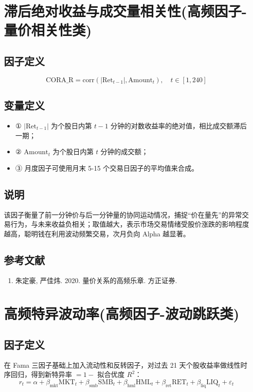 \documentclass{article}
\begin{document}
\section{滞后绝对收益与成交量相关性(高频因子-量价相关性类)}

\subsection{因子定义}
\begin{equation}
    \mathrm{CORA\_R} = \mathrm{corr}(|\mathrm{Ret}_{t-1}|, \mathrm{Amount}_t), \quad t \in [1, 240]
\end{equation}

\subsection{变量定义}
\begin{itemize}
    \item ① \( |\mathrm{Ret}_{t-1}| \) 为个股日内第 \( t-1 \) 分钟的对数收益率的绝对值，相比成交额滞后一期；
    \item ② \( \mathrm{Amount}_t \) 为个股日内第 \( t \) 分钟的成交额；
    \item ③ 月度因子可使用月末 5-15 个交易日因子的平均值来合成。
\end{itemize}

\subsection{说明}
该因子衡量了前一分钟价与后一分钟量的协同运动情况，捕捉“价在量先”的异常交易行为，与未来收益负相关；取值越大，表示市场交易情绪受股价涨跌的影响程度越高，聪明钱在利用波动频繁交易，次月负向 Alpha 越显著。

\subsection{参考文献}
\begin{enumerate}
    \item 朱定豪, 严佳炜. 2020. 量价关系的高频乐章. 方正证券.
\end{enumerate}

\section{高频特异波动率(高频因子-波动跳跃类)}

\subsection{因子定义}
在 Fama 三因子基础上加入流动性和反转因子，对过去 21 天个股收益率做线性时序回归，得到新特异率 \( = 1 - \) 拟合优度 \( R^2 \)：
\begin{equation}
    r_t = \alpha + \beta_{\mathrm{mkt}} \mathrm{MKT}_t + \beta_{\mathrm{smb}} \mathrm{SMB}_t + \beta_{\mathrm{hml}} \mathrm{HML}_t + \beta_{\mathrm{ret}} \mathrm{RET}_t + \beta_{\mathrm{liq}} \mathrm{LIQ}_t + \varepsilon_t
\end{equation}
\end{document}
